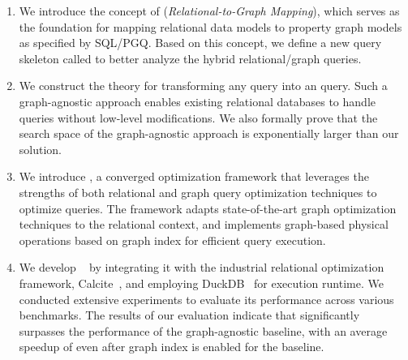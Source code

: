 \begin{enumerate}
\item We introduce the concept of \rgmapping (\emph{Relational-to-Graph Mapping}), which serves as the foundation for mapping relational data models to property graph models as specified by SQL/PGQ. Based on this concept, we define a new query skeleton called \spjm to better analyze the hybrid relational/graph queries.

\item We construct the theory for transforming any \spjm query into an \spj query. Such a graph-agnostic approach enables existing relational databases to handle \spjm queries without low-level modifications. We also formally prove that the search space
of the graph-agnostic approach is exponentially larger than our solution.

\item We introduce \name, a converged optimization framework that leverages the strengths of both relational and graph query optimization techniques to optimize \spjm queries. The framework adapts state-of-the-art graph optimization techniques to the relational context, and implements graph-based physical operations based on graph index for efficient query execution.

\item We develop \name~ by integrating it with the industrial relational optimization framework, Calcite~\cite{calcite}, and employing DuckDB~\cite{duckdb} for execution runtime. We conducted extensive experiments to evaluate its performance across various benchmarks. The results of our evaluation indicate that \name significantly surpasses the performance of the graph-agnostic baseline, with an average speedup of  even after graph index is enabled for the baseline.

\end{enumerate}

 


